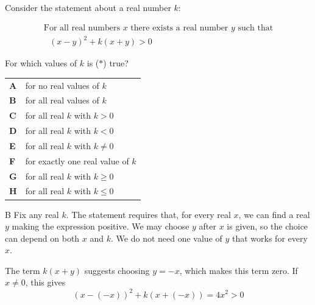 \documentclass[11pt,a4paper]{article}
\begin{document}
\clearpage
\thispagestyle{djssolutions}
\vspace*{8pt}
\begin{enumerate}[label=\textbf{\arabic*.},leftmargin=*,itemsep=0pt,start=20]
\questionitem[Logic]
Consider the statement about a real number $k$:

\[ \begin{array}{c}
\text{For all real numbers $x$ there exists a real number $y$ such that} \\ \text{ $(x-y)^2+k(x+y)>0$}
\end{array} \tag{$\ast$} \]

For which values of $k$ is ($\ast$) true?

\par\vspace*{12pt}
\begin{tabularx}{\linewidth}{@{}>{\bfseries}l Y@{}}
A &
for no real values of $k$
\\[0.8em]
B &
for all real values of $k$
\\[0.8em]
C &
for all real $k$ with $k>0$ 
\\[0.8em]
D &
for all real $k$ with $k<0$ 
\\[0.8em]
E &
for all real $k$ with $k\ne 0$ 
\\[0.8em]
F &
for exactly one real value of $k$
\\[0.8em]
G &
for all real $k$ with $k\geq0$ 
\\[0.8em]
H &
for all real $k$ with $k\leq 0$ 
\\
\end{tabularx}

\begin{djsSolution}{B}
Fix any real $k$. The statement requires that, for every real $x$, we can find a real $y$ making the expression positive. We may choose $y$ after $x$ is given, so the choice can depend on both $x$ and $k$. We do not need one value of $y$ that works for every $x$.

The term $k(x+y)$ suggests choosing $y=-x$, which makes this term zero. If $x\ne0$, this gives
\[
(x-(-x))^2+k(x+(-x))=4x^2>0
\]


\end{djsSolution}
\end{enumerate}
\end{document}
